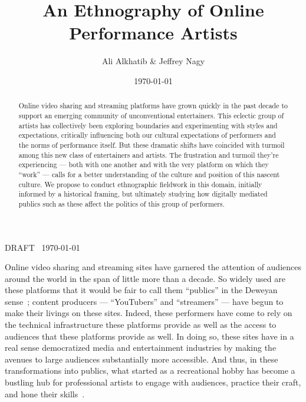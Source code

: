 \documentclass[10pt]{article}
\title{An Ethnography of Online Performance Artists}
\author{Ali Alkhatib \& Jeffrey Nagy}
\date{\today}
\makeatletter
\def\maketitle{%
\par{\centering {\scshape \LARGE \textbf{\@title}}%
\par{\@author}
\par{DRAFT \DTMcurrenttime~\today}%
\par}}
\newcommand{\ali}[1]{{\color{Red}[al2: #1]}}
\newcommand{\topic}[1]{{\color{Blue}#1}}
\renewcommand{\topic}[1]{{#1}}
\makeatother
\begin{document}
  \maketitle
  \begin{abstract}
  Online video sharing and streaming platforms have grown quickly in the past decade
  to support an emerging community of unconventional entertainers.
  This eclectic group of artists has collectively been
  exploring boundaries and experimenting with styles and expectations,
  critically influencing both our cultural expectations of performers and the norms of performance itself.
  But these dramatic shifts have coincided with turmoil among this new class of entertainers and artists.
  The frustration and turmoil they're experiencing
  --- both with one another and with the very platform on which they ``work'' ---
  calls for a better understanding of the culture and position of this nascent culture.
  We propose to conduct ethnographic fieldwork in this domain,
  initially informed by a historical framing, but
  ultimately studying how digitally mediated publics such as these affect
  the politics of this group of performers.
  \end{abstract}



\topic{Online video sharing %
and streaming sites %
have garnered the attention of audiences around the world
in the span of little more than a decade.} %
So widely used are these platforms
that it would be fair to call them ``publics'' in the Deweyan sense~\cite{dewey2012public,disalvo2009design};
content producers
--- ``YouTubers'' and ``streamers'' ---
have begun to make their livings on these sites.
Indeed, these performers have come to rely on
the technical infrastructure these platforms provide as well as
the access to audiences that these platforms provide as well.
In doing so, these sites have in a real sense democratized media and entertainment industries by
making the avenues to large audiences substantially more accessible.
And thus, in these transformations into publics, what started as
a recreational hobby
has become a bustling hub for professional artists to
engage with audiences,
practice their craft, and 
hone their skills~\cite{Hamilton:2014:STF:2611105.2557048,Zhang:2015:CIL:2736084.2736091}.
\end{document}
